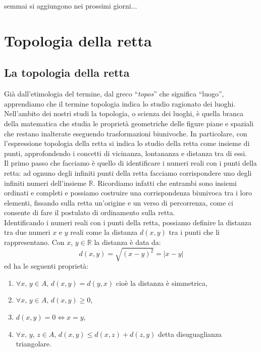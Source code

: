 semmai si aggiungono nei prossimi giorni...


\chapter{Topologia della retta}
\section{La topologia della retta}
Già dall'etimologia del termine, dal greco ``\emph{topos}'' che significa 
``luogo'', apprendiamo che il termine topologia indica lo studio ragionato 
dei luoghi. Nell'ambito dei nostri studi la topologia, o scienza dei luoghi, 
è quella branca della matematica che studia le proprietà geometriche delle 
figure piane e spaziali che restano inalterate eseguendo trasformazioni 
biunivoche. In particolare, con l'espressione topologia della retta si indica 
lo studio della retta come insieme di punti, approfondendo i concetti di 
vicinanza, lontananza e distanza tra di essi.\\

Il primo passo che facciamo è quello di identificare i numeri reali con i 
punti della retta: ad ognuno degli infiniti punti della retta facciamo 
corrispondere uno degli infiniti numeri dell'insieme $\mathbb{R}$. Ricordiamo 
infatti che entrambi sono insiemi ordinati e completi e possiamo costruire 
una corrispondenza biunivoca tra i loro elementi, fissando sulla retta 
un'origine e un verso di percorrenza, come ci consente di fare il postulato 
di ordinamento sulla retta.\\

Identificando i numeri reali con i punti della retta, possiamo definire la 
distanza tra due numeri $x$ e $y$ reali come la distanza $d(x, y)$ tra i 
punti che li rappresentano. Con $x$, $y\in\mathbb{R}$ la distanza è data da:
\begin{equation}
  d(x,y)=\sqrt{(x-y)^2}=\vert x-y\vert
\end{equation}
ed ha le seguenti proprietà:
\begin{enumerate}
  \item $\forall x,\,y \in A,\,d(x,y)=d(y,x)$ cioè la distanza è 
simmetrica,
  \item $\forall x,\,y \in A,\,d(x,y)\geq0$,
  \item $d(x,y)=0\Leftrightarrow x=y$,
  \item $\forall x,\,y,\,z \in A,\,d(x,y)\leq d(x,z)+d(z,y)$ detta 
disuguaglianza triangolare.
\end{enumerate}

